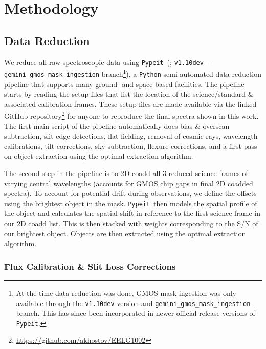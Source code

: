 \documentclass[twocolumn,tight,times,linenumbers]{aastex631}
\newcommand{\pypeit}{\texttt{Pypeit}}
\begin{document}
		\section{Methodology}
            \label{sec:methodology}
            
		\subsection{Data Reduction}
		We reduce all raw spectroscopic data using \pypeit~(\citealt{Prochaska2020}; \texttt{v1.10dev} -- \texttt{gemini\_gmos\_mask\_ingestion} branch\footnote{At the time data reduction was done, GMOS mask ingestion was only available through the \texttt{v1.10dev} version and \texttt{gemini\_gmos\_mask\_ingestion} branch. This has since been incorporated in newer official release versions of \pypeit.}), a \texttt{Python} semi-automated data reduction pipeline that supports many ground- and space-based facilities. The pipeline starts by reading the setup files that list the location of the science/standard \& associated calibration frames. These setup files are made available via the linked GitHub repository\footnote{\href{https://github.com/akhostov/EELG1002}{https://github.com/akhostov/EELG1002}} for anyone to reproduce the final spectra shown in this work. The first main script of the pipeline automatically does bias \& overscan subtraction, slit edge detections, flat fielding, removal of cosmic rays, wavelength calibrations, tilt corrections, sky subtraction, flexure corrections, and a first pass on object extraction using the \cite{Horne1986} optimal extraction algorithm. 
        
		The second step in the pipeline is to 2D coadd all 3 reduced science frames of varying central wavelengths (accounts for GMOS chip gaps in final 2D coadded spectra). To account for potential drift during observations, we define the offsets using the brightest object in the mask. \pypeit~then models the spatial profile of the object and calculates the spatial shift in reference to the first science frame in our 2D coadd list. This is then stacked with weights corresponding to the S/N of our brightest object. Objects are then extracted using the \cite{Horne1986} optimal extraction algorithm.
	
	
	
		\subsubsection{Flux Calibration \& Slit Loss Corrections}
		
\end{document}
